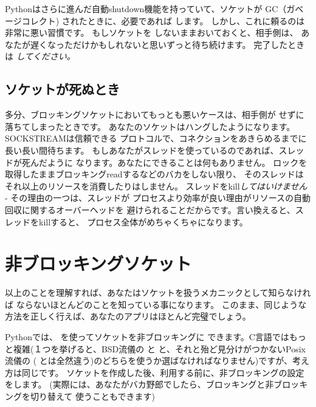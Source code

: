 \documentclass{howto}
\begin{document}
Pythonはさらに進んだ自動shutdown機能を持っていて、ソケットが
GC（ガベージコレクト) されたときに、必要であれば  します。
しかし、これに頼るのは非常に悪い習慣です。
もしソケットを  しないままおいておくと、相手側は、
あなたが遅くなっただけかもしれないと思いずっと待ち続けます。
完了したときは  \emph{してください。}



\subsection{ソケットが死ぬとき}

多分、ブロッキングソケットにおいてもっとも悪いケースは、相手側が 
せずに落ちてしまったときです。
あなたのソケットはハングしたようになります。SOCKSTREAMは信頼できる
プロトコルで、コネクションをあきらめるまでに長い長い間待ちます。
もしあなたがスレッドを使っているのであれば、スレッドが死んだように
なります。あなたにできることは何もありません。
ロックを取得したままブロッキングreadするなどのバカをしない限り、
そのスレッドはそれ以上のリソースを消費したりはしません。
スレッドをkill\emph{してはいけません} - その理由の一つは、スレッドが
プロセスより効率が良い理由がリソースの自動回収に関するオーバーヘッドを
避けられることだからです。言い換えると、スレッドをkillすると、
プロセス全体がめちゃくちゃになります。


\section{非ブロッキングソケット}

以上のことを理解すれば、あなたはソケットを扱うメカニックとして知らなければ
ならないほとんどのことを知っている事になります。
このまま、同じような方法を正しく行えば、あなたのアプリはほとんど完璧でしょう。


Pythonでは、  を使ってソケットを非ブロッキングに
できます。C言語ではもっと複雑(１つを挙げると、BSD流儀の  と
と、それと殆ど見分けがつかないPosix流儀の  (
とは全然違う)のどちらを使うか選ばなければなりません)ですが、考え方は同じです。
ソケットを作成した後、利用する前に、非ブロッキングの設定をします。
(実際には、あなたがバカ野郎でしたら、ブロッキングと非ブロッキングを切り替えて
使うこともできます)
\end{document}
